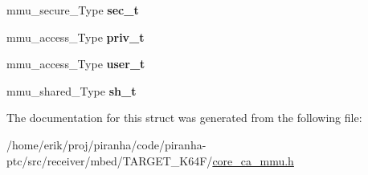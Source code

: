 \begin{DoxyCompactItemize}
\item 
mmu\+\_\+secure\+\_\+\+Type {\bfseries sec\+\_\+t}\hypertarget{structRegionStruct_ae8004f07bc61c36f27bd8b881e04b597}{}\label{structRegionStruct_ae8004f07bc61c36f27bd8b881e04b597}

\item 
mmu\+\_\+access\+\_\+\+Type {\bfseries priv\+\_\+t}\hypertarget{structRegionStruct_aca1e31dc5efb9db558fde5d0acc392c7}{}\label{structRegionStruct_aca1e31dc5efb9db558fde5d0acc392c7}

\item 
mmu\+\_\+access\+\_\+\+Type {\bfseries user\+\_\+t}\hypertarget{structRegionStruct_a0f45fe48c95fb9674571f6f085aa862e}{}\label{structRegionStruct_a0f45fe48c95fb9674571f6f085aa862e}

\item 
mmu\+\_\+shared\+\_\+\+Type {\bfseries sh\+\_\+t}\hypertarget{structRegionStruct_a7c73b178aa8eadb16dbe1aba75f3c5ad}{}\label{structRegionStruct_a7c73b178aa8eadb16dbe1aba75f3c5ad}

\end{DoxyCompactItemize}


The documentation for this struct was generated from the following file\+:\begin{DoxyCompactItemize}
\item 
/home/erik/proj/piranha/code/piranha-\/ptc/src/receiver/mbed/\+T\+A\+R\+G\+E\+T\+\_\+\+K64\+F/\hyperlink{core__ca__mmu_8h}{core\+\_\+ca\+\_\+mmu.\+h}\end{DoxyCompactItemize}
